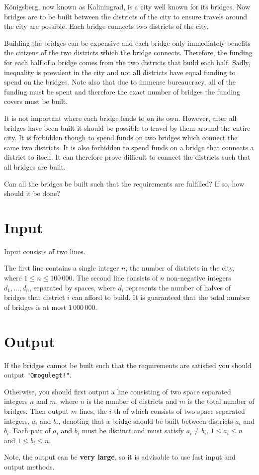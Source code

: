 
Königsberg, now known as Kaliningrad, is a city well known for its bridges.
Now bridges are to be built between the districts of the city to ensure travels around the city are possible.
Each bridge connects two districts of the city.

Building the bridges can be expensive and each bridge only immediately benefits the citizens of the two districts which the bridge connects.
Therefore, the funding for each half of a bridge comes from the two districts that build each half.
Sadly, inequality is prevalent in the city and not all districts have equal funding to spend on the bridges.
Note also that due to immense bureaucracy, all of the funding must be spent and therefore the exact number of bridges the funding covers must be built.

It is not important where each bridge leads to on its own.
However, after all bridges have been built it should be possible to travel by them around the entire city.
It is forbidden though to spend funds on two bridges which connect the same two districts.
It is also forbidden to spend funds on a bridge that connects a district to itself.
It can therefore prove difficult to connect the districts such that all bridges are built.

Can all the bridges be built such that the requirements are fulfilled?
If so, how should it be done?

\section*{Input}
Input consists of two lines.

The first line contains a single integer $n$, the number of districts in the city, where $1 \leq n \leq 100\,000$.
The second line consists of $n$ non-negative integers $d_1, \dotsc, d_n$, separated by spaces,
where $d_i$ represents the number of halves of bridges that district $i$ can afford to build.
It is guaranteed that the total number of bridges is at most $1\,000\,000$.

\section*{Output}
If the bridges cannot be built such that the requirements are satisfied you should output \texttt{"Omogulegt!"}.

Otherwise, you should first output a line consisting of two space separated integers $n$ and $m$, where $n$ is the number of districts and $m$ is the total number of bridges.
Then output $m$ lines, the $i$-th of which consists of two space separated integers, $a_i$ and $b_i$, denoting that a bridge should be built between districts $a_i$ and $b_i$.
Each pair of $a_i$ and $b_i$ must be distinct and must satisfy $a_i \neq b_i$, $1 \leq a_i \leq n$ and $1 \leq b_i \leq n$.

Note, the output can be \textbf{very large}, so it is advisable to use fast input and output methods.
